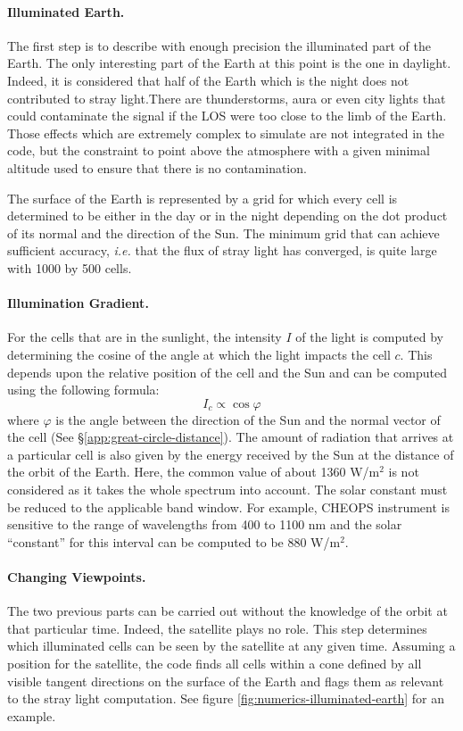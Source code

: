 \documentclass[a4paper,10pt]{article}
\begin{document}
\paragraph{Illuminated Earth.}
The first step is to describe with enough precision the illuminated part of the Earth. The only interesting part of the Earth at this point is the one in daylight. Indeed, it is considered that half of the Earth which is the night does not contributed to stray light.There are thunderstorms, aura or even city lights that could contaminate the signal if the LOS were too close to the limb of the Earth. 
Those effects which are extremely complex to simulate are not integrated in the code, but the constraint to point above the atmosphere with a given minimal altitude used to ensure that there is no contamination.

The surface of the Earth is represented by a grid for which every cell is determined to be either in the day or in the night depending on the dot product of its normal and the direction of the Sun. The minimum grid that can achieve sufficient accuracy, \emph{i.e.} that the flux of stray light has converged, is quite large with 1000 by 500 cells.

\paragraph{Illumination Gradient.}
For the cells that are in the sunlight, the intensity $I$ of the light is computed by determining the cosine of the angle at which the light impacts the cell $c$. This depends upon the relative position of the cell and the Sun and can be computed using the following formula:
\begin{equation}
 I_c \propto \cos \varphi
\end{equation}
where $\varphi$ is the angle between the direction of the Sun and the normal vector of the cell (See \S\ref{app:great-circle-distance}).
The amount of radiation that arrives at a particular cell is also given by the energy received by the Sun at the distance of the orbit of the Earth. Here, the common value of about 1360 W/m$^2$ is not considered as it takes the whole spectrum into account. The solar constant must be reduced to the applicable band window. For example, CHEOPS instrument is sensitive to the range of wavelengths from 400 to 1100 nm and the solar ``constant'' for this interval can be computed to be 880 W/m$^2$. 

\paragraph{Changing Viewpoints.}
The two previous parts can be carried out without the knowledge of the orbit at that particular time. Indeed, the satellite plays no role. This step determines which illuminated cells can be seen by the satellite at any given time. Assuming a position for the satellite, the code finds all cells within a cone defined by all visible tangent directions on the surface of the Earth and flags them as relevant to the stray light computation. See figure \ref{fig:numerics-illuminated-earth} for an example.
\end{document}

